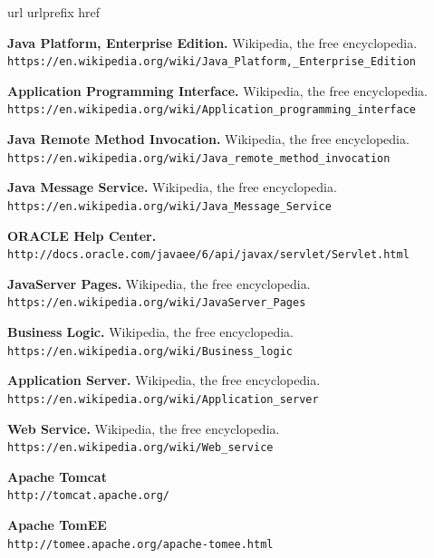 \documentclass[a4paper, 10pt]{article}
\begin{document}
\newpage
\begin{thebibliography}{10}
	\expandafter\ifx\csname url\endcsname\relax
	  \def\url#1{\texttt{#1}}\fi
	\expandafter\ifx\csname urlprefix\endcsname\relax\def\urlprefix{URL }\fi
	\expandafter\ifx\csname href\endcsname\relax
	  \def\href#1#2{#2} \def\path#1{#1}\fi
	
	\textbf{Java Platform, Enterprise Edition.} Wikipedia, the free encyclopedia.\\
		\url{https://en.wikipedia.org/wiki/Java_Platform,_Enterprise_Edition}
	
	\textbf{Application Programming Interface.} Wikipedia, the free encyclopedia.\\
		\url{https://en.wikipedia.org/wiki/Application_programming_interface}
	
	\textbf{Java Remote Method Invocation.} Wikipedia, the free encyclopedia.\\
		\url{https://en.wikipedia.org/wiki/Java_remote_method_invocation}
	
	\textbf{Java Message Service.} Wikipedia, the free encyclopedia.\\
		\url{https://en.wikipedia.org/wiki/Java_Message_Service}
	
	\textbf{ORACLE Help Center.}\\
		\url{http://docs.oracle.com/javaee/6/api/javax/servlet/Servlet.html}
	
	\textbf{JavaServer Pages.} Wikipedia, the free encyclopedia.\\
		\url{https://en.wikipedia.org/wiki/JavaServer_Pages}
	
	\textbf{Business Logic.} Wikipedia, the free encyclopedia.\\
		\url{https://en.wikipedia.org/wiki/Business_logic}

	\textbf{Application Server.} Wikipedia, the free encyclopedia.\\
		\url{https://en.wikipedia.org/wiki/Application_server}

	\textbf{Web Service.} Wikipedia, the free encyclopedia.\\
		\url{https://en.wikipedia.org/wiki/Web_service}
	
	\textbf{Apache Tomcat}\\
		\url{http://tomcat.apache.org/}

	\textbf{Apache TomEE}\\
		\url{http://tomee.apache.org/apache-tomee.html}


\end{thebibliography}
\end{document}
